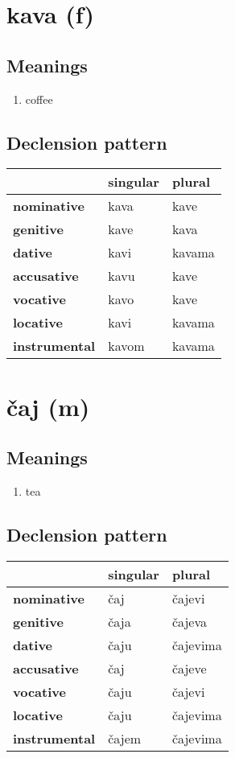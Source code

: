 \filbreak
\section{kava (f)}
\subsection*{Meanings}
\begin{enumerate}
\item coffee
\end{enumerate}
\subsection*{Declension pattern}
\begin{tabularx}{\linewidth}{Xll}
\toprule
{} & singular &  plural \\
\midrule
\textbf{nominative  } &     kava &    kave \\
\textbf{genitive    } &     kave &    kava \\
\textbf{dative      } &     kavi &  kavama \\
\textbf{accusative  } &     kavu &    kave \\
\textbf{vocative    } &     kavo &    kave \\
\textbf{locative    } &     kavi &  kavama \\
\textbf{instrumental} &    kavom &  kavama \\
\bottomrule
\end{tabularx}

\filbreak
\section{čaj (m)}
\subsection*{Meanings}
\begin{enumerate}
\item tea
\end{enumerate}
\subsection*{Declension pattern}
\begin{tabularx}{\linewidth}{Xll}
\toprule
{} & singular &    plural \\
\midrule
\textbf{nominative  } &      čaj &    čajevi \\
\textbf{genitive    } &     čaja &    čajeva \\
\textbf{dative      } &     čaju &  čajevima \\
\textbf{accusative  } &      čaj &    čajeve \\
\textbf{vocative    } &     čaju &    čajevi \\
\textbf{locative    } &     čaju &  čajevima \\
\textbf{instrumental} &    čajem &  čajevima \\
\bottomrule
\end{tabularx}

